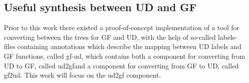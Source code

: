 












\subsection{Useful synthesis between UD and GF}


Prior to this work there existed a proof-of-concept implementation of a tool for converting between the trees for GF and UD,
with the help of so-called labels-files containing annotations which describe the mapping between UD labels and GF functions,
called gf-ud, which contains both a component for converting from UD to GF, called ud2gf\cite{kolachina-ranta-2017}\footnotemark[1]
and a component for converting from GF to UD, called gf2ud\cite{kolachina-ranta-2016}\footnotemark[1]. This work will focus on the ud2gf component.

